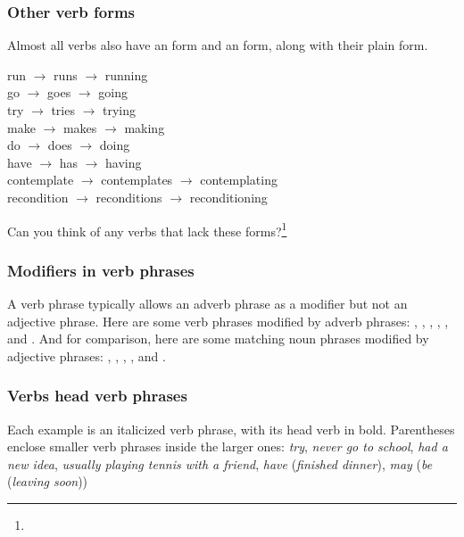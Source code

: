 \subsubsection*{Other verb forms}
Almost all verbs also have an  form and an  form, along with their plain form.

\ea
run $\rightarrow$ runs $\rightarrow$ running\\
go $\rightarrow$ goes $\rightarrow$ going\\
try $\rightarrow$ tries $\rightarrow$ trying\\
make $\rightarrow$ makes $\rightarrow$ making\\
do $\rightarrow$ does $\rightarrow$ doing\\
have $\rightarrow$ has $\rightarrow$ having\\
contemplate $\rightarrow$ contemplates $\rightarrow$ contemplating\\
recondition $\rightarrow$ reconditions $\rightarrow$ reconditioning
\z

Can you think of any verbs that lack these forms?\footnote{
}

\subsubsection*{Modifiers in verb phrases}
A verb phrase typically allows an adverb phrase as a modifier but not an adjective phrase. Here are some verb phrases modified by adverb phrases:  , , , , , and . And for comparison, here are some matching noun phrases modified by adjective phrases:  , , , , and .

\subsubsection*{Verbs head verb phrases}
Each example is an italicized verb phrase, with its head verb in bold. Parentheses enclose smaller verb phrases inside the larger ones: \textit{\emph{try}}, \textit{never \emph{go} to school}, \textit{\emph{had} a new idea}, \textit{usually \emph{playing} tennis with a friend}, \textit{\emph{have} }(\textit{\emph{finished} dinner}), \textit{\emph{may} }(\textit{\emph{be} }(\textit{\emph{leaving} soon}))

